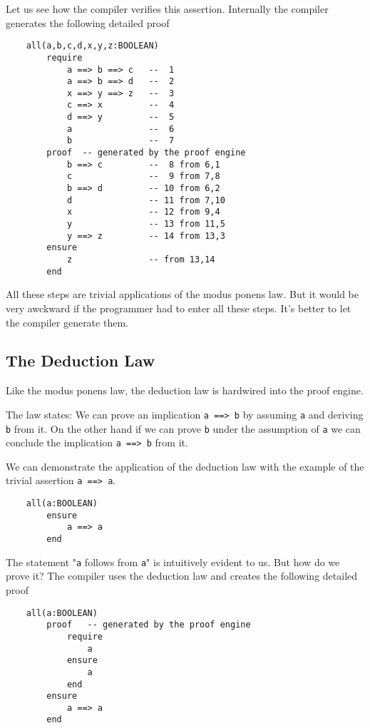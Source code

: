 Let us see how the compiler verifies this assertion. Internally the compiler
generates the following detailed proof

\begin{lstlisting}
    all(a,b,c,d,x,y,z:BOOLEAN)
        require
            a ==> b ==> c   --  1
            a ==> b ==> d   --  2
            x ==> y ==> z   --  3
            c ==> x         --  4
            d ==> y         --  5
            a               --  6
            b               --  7
        proof  -- generated by the proof engine
            b ==> c         --  8 from 6,1
            c               --  9 from 7,8
            b ==> d         -- 10 from 6,2
            d               -- 11 from 7,10
            x               -- 12 from 9,4
            y               -- 13 from 11,5
            y ==> z         -- 14 from 13,3
        ensure
            z               -- from 13,14
        end
\end{lstlisting}

All these steps are trivial applications of the modus ponens law. But it would
be very awckward if the programmer had to enter all these steps. It's better
to let the compiler generate them.

\subsection{The Deduction Law}

Like the modus ponens law, the deduction law is hardwired into the proof
engine.

The law states: We can prove an implication \lstinline!a ==> b! by assuming
\lstinline!a! and deriving \lstinline!b! from it. On the other hand if we can
prove \lstinline!b! under the assumption of \lstinline!a! we can conclude the
implication \lstinline!a ==> b! from it.


We can demonstrate the application of the deduction law with the example of
the trivial assertion \lstinline!a ==> a!.

\begin{lstlisting}
    all(a:BOOLEAN)
        ensure
            a ==> a
        end
\end{lstlisting}

The statement "\lstinline!a! follows from \lstinline!a!" is intuitively
evident to us. But how do we prove it? The compiler uses the deduction law and
creates the following detailed proof

\begin{lstlisting}
    all(a:BOOLEAN)
        proof   -- generated by the proof engine
            require
                a
            ensure
                a
            end
        ensure
            a ==> a
        end
\end{lstlisting}

